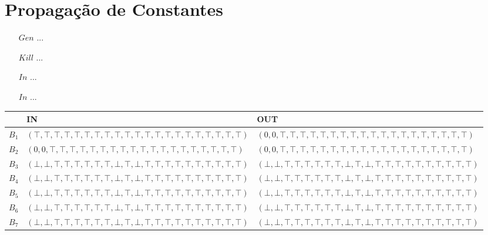 \section{Propaga\c{c}\~ao de Constantes}

\begin{itemize}
  \item[$Gen$] ...
  \item[$Kill$] ...
  \item[$In$] ...
  \item[$In$] ...
\end{itemize}

\begin{table}[ht]
\centering
\begin{tabular}{l|l|l}
	& IN & OUT\\
\hline
$B_{1}$ &  $(\top,\top,\top,\top,\top,\top,\top,\top,\top,\top,\top,\top,\top,\top,\top,\top,\top,\top,\top,\top,\top)$ & $(0,0,\top,\top,\top,\top,\top,\top,\top,\top,\top,\top,\top,\top,\top,\top,\top,\top,\top,\top,\top)$\\
$B_{2}$ &  $(0,0,\top,\top,\top,\top,\top,\top,\top,\top,\top,\top,\top,\top,\top,\top,\top,\top,\top,\top,\top)$ & $(0,0,\top,\top,\top,\top,\top,\top,\top,\top,\top,\top,\top,\top,\top,\top,\top,\top,\top,\top,\top)$\\
$B_{3}$ &  $(\bot,\bot,\top,\top,\top,\top,\top,\top,\bot,\top,\bot,\top,\top,\top,\top,\top,\top,\top,\top,\top,\top)$ & $(\bot,\bot,\top,\top,\top,\top,\top,\top,\bot,\top,\bot,\top,\top,\top,\top,\top,\top,\top,\top,\top,\top)$\\
$B_{4}$ &  $(\bot,\bot,\top,\top,\top,\top,\top,\top,\bot,\top,\bot,\top,\top,\top,\top,\top,\top,\top,\top,\top,\top)$ & $(\bot,\bot,\top,\top,\top,\top,\top,\top,\bot,\top,\bot,\top,\top,\top,\top,\top,\top,\top,\top,\top,\top)$\\
$B_{5}$ &  $(\bot,\bot,\top,\top,\top,\top,\top,\top,\bot,\top,\bot,\top,\top,\top,\top,\top,\top,\top,\top,\top,\top)$ & $(\bot,\bot,\top,\top,\top,\top,\top,\top,\bot,\top,\bot,\top,\top,\top,\top,\top,\top,\top,\top,\top,\top)$\\
$B_{6}$ &  $(\bot,\bot,\top,\top,\top,\top,\top,\top,\bot,\top,\bot,\top,\top,\top,\top,\top,\top,\top,\top,\top,\top)$ & $(\bot,\bot,\top,\top,\top,\top,\top,\top,\bot,\top,\bot,\top,\top,\top,\top,\top,\top,\top,\top,\top,\top)$\\
$B_{7}$ &  $(\bot,\bot,\top,\top,\top,\top,\top,\top,\bot,\top,\bot,\top,\top,\top,\top,\top,\top,\top,\top,\top,\top)$ & $(\bot,\bot,\top,\top,\top,\top,\top,\top,\bot,\top,\bot,\top,\top,\top,\top,\top,\top,\top,\top,\top,\top)$\\

\end{tabular}
\end{table}

